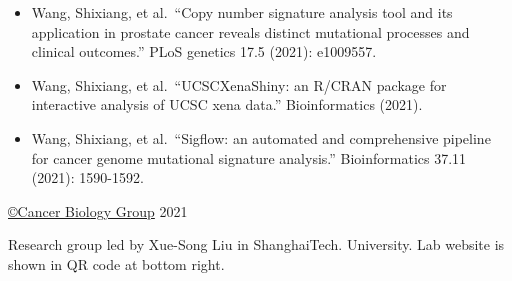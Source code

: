 \documentclass[
]{article}
\providecommand{\tightlist}{%
  \setlength{\itemsep}{0pt}\setlength{\parskip}{0pt}}
\begin{document}
\begin{itemize}
\tightlist
\item
  Wang, Shixiang, et al.~``Copy number signature analysis tool and its
  application in prostate cancer reveals distinct mutational processes
  and clinical outcomes.'' PLoS genetics 17.5 (2021): e1009557.
\item
  Wang, Shixiang, et al.~``UCSCXenaShiny: an R/CRAN package for
  interactive analysis of UCSC xena data.'' Bioinformatics (2021).
\item
  Wang, Shixiang, et al.~``Sigflow: an automated and comprehensive
  pipeline for cancer genome mutational signature analysis.''
  Bioinformatics 37.11 (2021): 1590-1592.
\end{itemize}

\href{https://github.com/XSLiuLab/}{©Cancer Biology Group} 2021

Research group led by Xue-Song Liu in ShanghaiTech. University. Lab
website is shown in QR code at bottom right.
\end{document}
